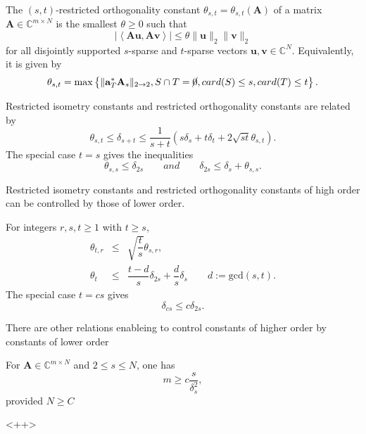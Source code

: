 \begin{definition}
    \label{def2.4}
    The $(s,t)$-restricted orthogonality constant $\theta_{s,t} = \theta_{s,t}(\mathbf{A})$ of a matrix $\mathbf{A} \in \mathbb{C}^{m \times N}$ is the smallest $\theta \geq 0$ such that
    \begin{equation}
        \label{eq2.4}
        \left|\left<\mathbf{Au}, \mathbf{Av}\right>\right| \leq \theta \|\mathbf{u}\|_2 \|\mathbf{v}\|_2
    \end{equation}
    for all disjointly supported $s$-sparse and $t$-sparse vectors $\mathbf{u,v} \in \mathbb{C}^N$. Equivalently, it is given by 
    \begin{equation}
        \label{eq2.5}
        \theta_{s,t} = \max\left\{\|\mathbf{a}_T^*\mathbf{A}_s\|_{2 \rightarrow 2}, S \cap T = \cancel{0}, card(S) \leq s, card(T) \leq t\right\}.
    \end{equation}
\end{definition}

\begin{proposition}
    \label{pr2.5}
    Restricted isometry constants and restricted orthogonality constants are related by
    \begin{equation*}
        \theta_{s,t} \leq \delta_{s+t} \leq \dfrac{1}{s+t}(s\delta_s + t\delta_t +2 \sqrt{st}\theta_{s,t}).
    \end{equation*}
    The special case $t=s$ gives the inequalities
    \begin{equation*}
        \theta_{s,s} \leq \delta_{2s} \qquad and \qquad \delta_{2s} \leq \delta_s + \theta_{s,s}.
    \end{equation*}
\end{proposition}

Restricted isometry constants and restricted orthogonality constants of high order can be controlled by those of lower order.
\begin{proposition}
    \label{pr1.6}
    For integers $r,s,t \geq 1$ with $t \geq s$,
    \begin{eqnarray*}
        \theta_{t,r} &\leq& \sqrt{\dfrac{t}{s}}\theta_{s,r}, \\
    \theta_t &\leq& \dfrac{t-d}{s}\delta_{2s} + \dfrac{d}{s} \delta_s \qquad d:= \text{gcd}(s,t).
    \end{eqnarray*}
    The special case $t= cs$ gives 
    \[
        \delta_{cs} \leq c \delta_{2s}.
    \]
\end{proposition}

\begin{remark}
    \label{rmk2.7}
    There are other relations enableing to control constants of higher order by constants of lower order
\end{remark}

\begin{theorem}
    \label{th1.8}
    For $\mathbf{A} \in \mathbb{C}^{m \times N}$ and $2 \leq s \leq N$, one has
    \begin{equation}
        m \geq c \dfrac{s}{\delta_s^2},
        \label{eq1.9}
    \end{equation}
    provided $N \geq C$
\end{theorem}<++>


















